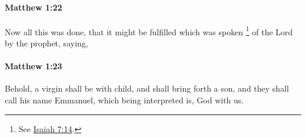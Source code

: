 		\paragraph{Matthew 1:22} %
			\label{MATTHEW-1-22}

			Now all this was done, that it might be fulfilled which was spoken%
				\footnote{%
					See \hyperref[ISAIAH-7-14]{Isaiah 7:14}.
					}
			of the Lord by the prophet, saying,

			\begin{framed}
			\scriptsize
				\begin{compactdesc}
					\item[SBLG] 
				\end{compactdesc}
			\end{framed}

		\paragraph{Matthew 1:23} %
			\label{MATTHEW-1-23}

			Behold, a virgin shall be with child, and shall bring forth a son, and they shall call his name Emmanuel, which being interpreted is, God with us.

